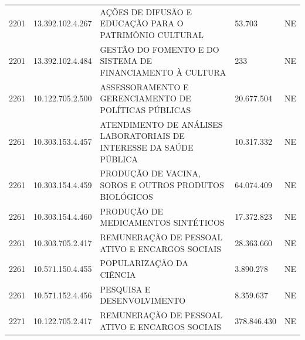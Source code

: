 \documentclass{article}
\begin{document}
\begin{longtable}[c]{m{1cm}|m{2cm}|m{10cm}|m{2cm}|m{1cm}}
\multicolumn{1}{C{1cm}|}{2201} & \multicolumn{1}{C{2cm}|}{13.392.102.4.267} & \multicolumn{1}{L{10cm}|}{AÇÕES DE DIFUSÃO E EDUCAÇÃO PARA O PATRIMÔNIO CULTURAL} & \multicolumn{1}{R{2cm}|}{53.703} & \multicolumn{1}{C{1cm}}{NE} \\
\multicolumn{1}{C{1cm}|}{2201} & \multicolumn{1}{C{2cm}|}{13.392.102.4.484} & \multicolumn{1}{L{10cm}|}{GESTÃO DO FOMENTO E DO SISTEMA DE FINANCIAMENTO À CULTURA} & \multicolumn{1}{R{2cm}|}{233} & \multicolumn{1}{C{1cm}}{NE} \\
\multicolumn{1}{C{1cm}|}{2261} & \multicolumn{1}{C{2cm}|}{10.122.705.2.500} & \multicolumn{1}{L{10cm}|}{ASSESSORAMENTO E GERENCIAMENTO DE POLÍTICAS PÚBLICAS} & \multicolumn{1}{R{2cm}|}{20.677.504} & \multicolumn{1}{C{1cm}}{NE} \\
\multicolumn{1}{C{1cm}|}{2261} & \multicolumn{1}{C{2cm}|}{10.303.153.4.457} & \multicolumn{1}{L{10cm}|}{ATENDIMENTO DE ANÁLISES LABORATORIAIS DE INTERESSE DA SAÚDE PÚBLICA} & \multicolumn{1}{R{2cm}|}{10.317.332} & \multicolumn{1}{C{1cm}}{NE} \\
\multicolumn{1}{C{1cm}|}{2261} & \multicolumn{1}{C{2cm}|}{10.303.154.4.459} & \multicolumn{1}{L{10cm}|}{PRODUÇÃO DE VACINA, SOROS E OUTROS PRODUTOS BIOLÓGICOS} & \multicolumn{1}{R{2cm}|}{64.074.409} & \multicolumn{1}{C{1cm}}{NE} \\
\multicolumn{1}{C{1cm}|}{2261} & \multicolumn{1}{C{2cm}|}{10.303.154.4.460} & \multicolumn{1}{L{10cm}|}{PRODUÇÃO DE MEDICAMENTOS SINTÉTICOS} & \multicolumn{1}{R{2cm}|}{17.372.823} & \multicolumn{1}{C{1cm}}{NE} \\
\multicolumn{1}{C{1cm}|}{2261} & \multicolumn{1}{C{2cm}|}{10.303.705.2.417} & \multicolumn{1}{L{10cm}|}{REMUNERAÇÃO DE PESSOAL ATIVO E ENCARGOS SOCIAIS} & \multicolumn{1}{R{2cm}|}{28.363.660} & \multicolumn{1}{C{1cm}}{NE} \\
\multicolumn{1}{C{1cm}|}{2261} & \multicolumn{1}{C{2cm}|}{10.571.150.4.455} & \multicolumn{1}{L{10cm}|}{POPULARIZAÇÃO DA CIÊNCIA} & \multicolumn{1}{R{2cm}|}{3.890.278} & \multicolumn{1}{C{1cm}}{NE} \\
\multicolumn{1}{C{1cm}|}{2261} & \multicolumn{1}{C{2cm}|}{10.571.152.4.456} & \multicolumn{1}{L{10cm}|}{PESQUISA E DESENVOLVIMENTO} & \multicolumn{1}{R{2cm}|}{8.359.637} & \multicolumn{1}{C{1cm}}{NE} \\
\multicolumn{1}{C{1cm}|}{2271} & \multicolumn{1}{C{2cm}|}{10.122.705.2.417} & \multicolumn{1}{L{10cm}|}{REMUNERAÇÃO DE PESSOAL ATIVO E ENCARGOS SOCIAIS} & \multicolumn{1}{R{2cm}|}{378.846.430} & \multicolumn{1}{C{1cm}}{NE} \\

\end{longtable}
\end{document}
